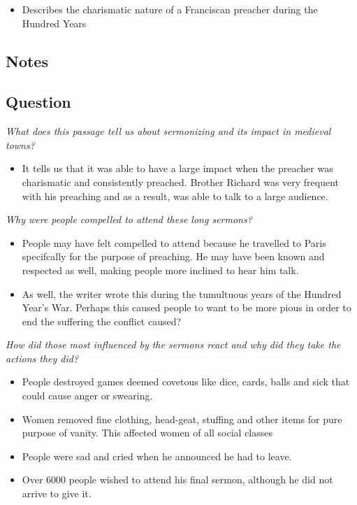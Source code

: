 \documentclass[12pt]{article}
\begin{document}
\begin{itemize}
	\item Describes the charismatic nature of a Franciscan preacher during the Hundred Years
\end{itemize}

\subsection*{Notes}

\subsection*{Question}

\textit{What does this passage tell us about sermonizing and its impact in medieval towns?}
\begin{itemize}
	\item It tells us that it was able to have a large impact when the preacher was charismatic and consistently preached. Brother Richard was very frequent with his preaching and as a result, was able to talk to a large audience.
\end{itemize}
\textit{Why were people compelled to attend these long sermons?}
\begin{itemize}
	\item People may have felt compelled to attend because he travelled to Paris specifcally for the purpose of preaching. He may have been known and respected as well, making people more inclined to hear him talk.
	\item As well, the writer wrote this during the tumultuous years of the Hundred Year's War. Perhaps this caused people to want to be more pious in order to end the suffering the conflict caused?
\end{itemize}
\textit{How did those most influenced by the sermons react and why did they take the actions they did?}
\begin{itemize}
	\item People destroyed games deemed covetous like dice, cards, balls and sick that could cause anger or swearing.
	\item Women removed fine clothing, head-geat, stuffing and other items for pure purpose of vanity. This affected women of all social classes
	\item People were sad and cried when he announced he had to leave.
	\item Over 6000 people wished to attend his final sermon, although he did not arrive to give it.
\end{itemize}
\end{document}
